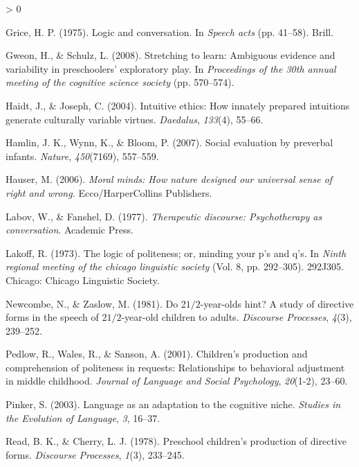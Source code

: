 \documentclass[
  english,
  man,floatsintext]{apa6}
\newlength{\cslhangindent}
\newenvironment{CSLReferences}[2] %
 {%
  \setlength{\parindent}{0pt}
  \ifodd #1 \everypar{\setlength{\hangindent}{\cslhangindent}}\ignorespaces\fi
  \ifnum #2 > 0
  \setlength{\parskip}{#2\baselineskip}
  \fi
 }%
 {}
\begin{document}
\begin{CSLReferences}{1}{0}
\leavevmode\hypertarget{ref-grice1975}{}%
Grice, H. P. (1975). Logic and conversation. In \emph{Speech acts} (pp. 41--58). Brill.

\leavevmode\hypertarget{ref-gweon2008}{}%
Gweon, H., \& Schulz, L. (2008). Stretching to learn: Ambiguous evidence and variability in preschoolers' exploratory play. In \emph{Proceedings of the 30th annual meeting of the cognitive science society} (pp. 570--574).

\leavevmode\hypertarget{ref-haidt2004}{}%
Haidt, J., \& Joseph, C. (2004). Intuitive ethics: How innately prepared intuitions generate culturally variable virtues. \emph{Daedalus}, \emph{133}(4), 55--66.

\leavevmode\hypertarget{ref-hamlin2007}{}%
Hamlin, J. K., Wynn, K., \& Bloom, P. (2007). Social evaluation by preverbal infants. \emph{Nature}, \emph{450}(7169), 557--559.

\leavevmode\hypertarget{ref-hauser2006}{}%
Hauser, M. (2006). \emph{Moral minds: How nature designed our universal sense of right and wrong.} Ecco/HarperCollins Publishers.

\leavevmode\hypertarget{ref-labov1977}{}%
Labov, W., \& Fanshel, D. (1977). \emph{Therapeutic discourse: Psychotherapy as conversation}. Academic Press.

\leavevmode\hypertarget{ref-lakoff1973}{}%
Lakoff, R. (1973). The logic of politeness; or, minding your p's and q's. In \emph{Ninth regional meeting of the chicago linguistic society} (Vol. 8, pp. 292--305). 292J305. Chicago: Chicago Linguistic Society.

\leavevmode\hypertarget{ref-newcombe1981}{}%
Newcombe, N., \& Zaslow, M. (1981). Do 2\(1/2\)-year-olds hint? A study of directive forms in the speech of 2\(1/2\)-year-old children to adults. \emph{Discourse Processes}, \emph{4}(3), 239--252.

\leavevmode\hypertarget{ref-pedlow2001}{}%
Pedlow, R., Wales, R., \& Sanson, A. (2001). Children's production and comprehension of politeness in requests: Relationships to behavioral adjustment in middle childhood. \emph{Journal of Language and Social Psychology}, \emph{20}(1-2), 23--60.

\leavevmode\hypertarget{ref-pinker2003}{}%
Pinker, S. (2003). Language as an adaptation to the cognitive niche. \emph{Studies in the Evolution of Language}, \emph{3}, 16--37.

\leavevmode\hypertarget{ref-read1978}{}%
Read, B. K., \& Cherry, L. J. (1978). Preschool children's production of directive forms. \emph{Discourse Processes}, \emph{1}(3), 233--245.


\end{CSLReferences}
\end{document}
